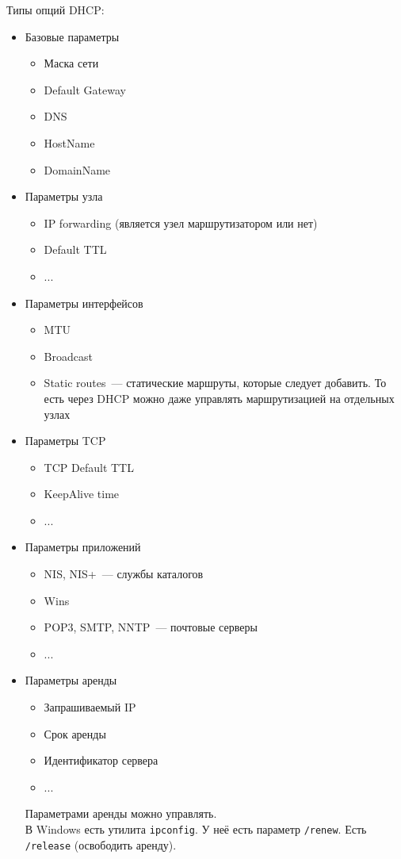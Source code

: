 Типы опций DHCP:
\begin{itemize}
    \item Базовые параметры
    \begin{itemize}
        \item Маска сети
        \item Default Gateway
        \item DNS
        \item HostName
        \item DomainName
    \end{itemize}
    \item Параметры узла
    \begin{itemize}
        \item IP forwarding (является узел маршрутизатором или нет)
        \item Default TTL
        \item ...
    \end{itemize}
    \item Параметры интерфейсов
    \begin{itemize}
        \item MTU
        \item Broadcast
        \item Static routes~--- статические маршруты, которые следует добавить. То есть через DHCP можно даже управлять маршрутизацией на отдельных узлах
    \end{itemize}
    \item Параметры TCP
    \begin{itemize}
        \item TCP Default TTL
        \item KeepAlive time
        \item ...
    \end{itemize}
    \item Параметры приложений
    \begin{itemize}
        \item NIS, NIS+~--- службы каталогов
        \item Wins
        \item POP3, SMTP, NNTP~--- почтовые серверы
        \item ...
    \end{itemize}
    \item Параметры аренды
    \begin{itemize}
        \item Запрашиваемый IP
        \item Срок аренды
        \item Идентификатор сервера
        \item ...
    \end{itemize}
    Параметрами аренды можно управлять.\\
    В Windows есть утилита {\tt ipconfig}. У неё есть параметр {\tt /renew}. Есть {\tt /release} (освободить аренду).
\end{itemize}


